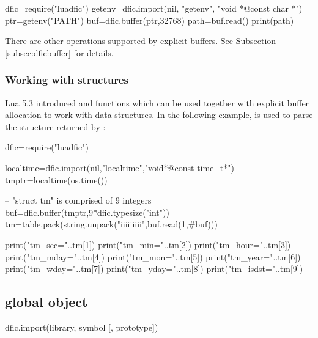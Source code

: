 \documentclass[a4paper,12pt,twoside,extrafontsizes]{memoir}
\begin{document}
\begin{breakshellcmds}\begin{luacode}
dfic=require("luadfic")
getenv=dfic.import(nil, "getenv", "void *@const char *")
ptr=getenv("PATH")
buf=dfic.buffer(ptr,32768)
path=buf.read()
print(path)
\end{luacode}\end{breakshellcmds}

There are other operations supported by explicit buffers. See Subsection \ref{subsec:dficbuffer} for details.

\subsubsection{Working with structures}

Lua 5.3 introduced  and  functions which can be used together with explicit buffer allocation to work with data structures. In the following example,  is used to parse the  structure returned by :

\begin{breakshellcmds}\begin{luacode}
dfic=require("luadfic")

localtime=dfic.import(nil,"localtime","void*@const time_t*")
tmptr=localtime({os.time()})

-- "struct tm" is comprised of 9 integers
buf=dfic.buffer(tmptr,9*dfic.typesize("int"))
tm=table.pack(string.unpack("iiiiiiiii",buf.read(1,#buf)))

print("tm_sec="..tm[1])
print("tm_min="..tm[2])
print("tm_hour="..tm[3])
print("tm_mday="..tm[4])
print("tm_mon="..tm[5])
print("tm_year="..tm[6])
print("tm_wday="..tm[7])
print("tm_yday="..tm[8])
print("tm_isdst="..tm[9])
\end{luacode}\end{breakshellcmds}

\subsection{ global object}
\label{subsec:dficobject}


\begin{luafuncprototype}
dfic.import(library, symbol [, prototype])
\end{luafuncprototype}
\end{document}
